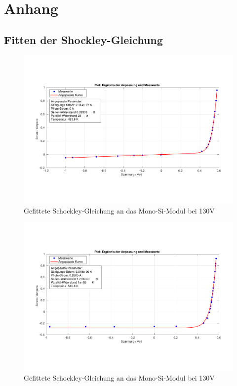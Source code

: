

\chapter{Anhang}
\label{chap:anhangA}


\section{Fitten der Shockley-Gleichung}

\begin{figure}[ht]
    \centering
    \includegraphics[width = \linewidth]{Bilder/SiMonoDunkelPlot.pdf}
    \caption{Gefittete Schockley-Gleichung an das Mono-Si-Modul bei 130V}
\end{figure}
\begin{figure}[ht]
    \centering
    \includegraphics[width = \linewidth]{Bilder/SiMulti130Plot.pdf}
    \caption{Gefittete Schockley-Gleichung an das Mono-Si-Modul bei 130V}
\end{figure}
